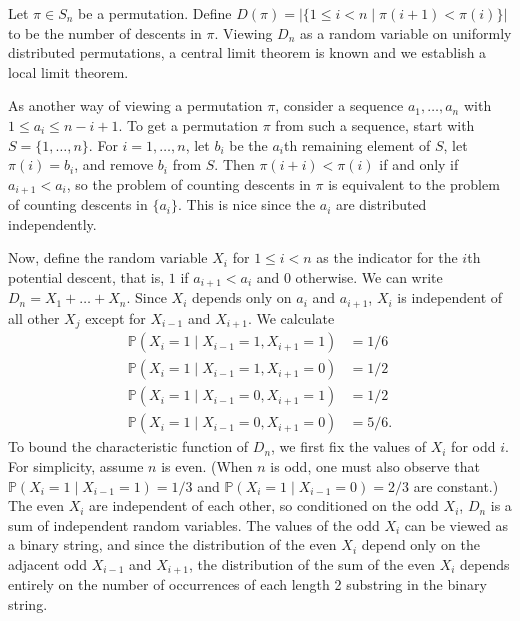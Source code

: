 \documentclass{article}
\newcommand{\abs}[1]{\left\lvert#1\right\rvert}
\renewcommand{\P}{\mathbb{P}}
\begin{document}
	Let $\pi \in S_n$ be a permutation. Define $D(\pi) = \abs{\{1 \leq i < n \mid \pi(i + 1) < \pi(i)\}}$ to be the number of descents in $\pi$. Viewing $D_n$ as a random variable on uniformly distributed permutations, a central limit theorem is known and we establish a local limit theorem.

	As another way of viewing a permutation $\pi$, consider a sequence $a_1, \ldots, a_n$ with $1 \leq a_i \leq n - i + 1$. To get a permutation $\pi$ from such a sequence, start with $S = \{1, \ldots, n\}$. For $i = 1, \ldots, n$, let $b_i$ be the $a_i$th remaining element of $S$, let $\pi(i) = b_i$, and remove $b_i$ from $S$. Then $\pi(i + i) < \pi(i)$ if and only if $a_{i+1} < a_i$, so the problem of counting descents in $\pi$ is equivalent to the problem of counting descents in $\{a_i\}$. This is nice since the $a_i$ are distributed independently.

	Now, define the random variable $X_i$ for $1 \leq i < n$ as the indicator for the $i$th potential descent, that is, $1$ if $a_{i+1} < a_i$ and $0$ otherwise. We can write $D_n = X_1 + \ldots + X_n$. Since $X_i$ depends only on $a_i$ and $a_{i+1}$, $X_i$ is independent of all other $X_j$ except for $X_{i-1}$ and $X_{i+1}$. We calculate
	\begin{align*}
		\P(X_i = 1 \mid X_{i-1} = 1, X_{i+1} = 1) &= 1/6 \\
		\P(X_i = 1 \mid X_{i-1} = 1, X_{i+1} = 0) &= 1/2 \\
		\P(X_i = 1 \mid X_{i-1} = 0, X_{i+1} = 1) &= 1/2 \\
		\P(X_i = 1 \mid X_{i-1} = 0, X_{i+1} = 0) &= 5/6.
	\end{align*}
	To bound the characteristic function of $D_n$, we first fix the values of $X_i$ for odd $i$. For simplicity, assume $n$ is even. (When $n$ is odd, one must also observe that $\P(X_i = 1 \mid X_{i-1} = 1) = 1/3$ and $\P(X_i = 1 \mid X_{i-1} = 0) = 2/3$ are constant.) The even $X_i$ are independent of each other, so conditioned on the odd $X_i$, $D_n$ is a sum of independent random variables. The values of the odd $X_i$ can be viewed as a binary string, and since the distribution of the even $X_i$ depend only on the adjacent odd $X_{i-1}$ and $X_{i+1}$, the distribution of the sum of the even $X_i$ depends entirely on the number of occurrences of each length 2 substring in the binary string.
\end{document}
